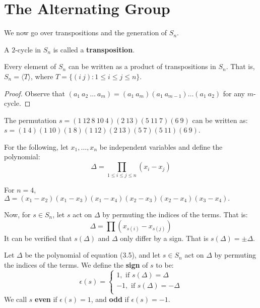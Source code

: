 \section{The Alternating Group}
\label{section_3.6}

We now go over transpositions and the generation of $S_n$.

\begin{definition}
  A $2$-cycle in  $S_n$ is called a \textbf{transposition}.
\end{definition}

\begin{proposition}\label{proposition_3.6.1}
  Every element of $S_n$ can be written as a product of transpositions in
  $S_n$. That is,  $S_n=\langle T \rangle $, where $T=\{(i \ j) : 1 \leq i \leq j \leq
  n\}$.
\end{proposition}
\begin{proof}
  Observe that $(a_1 \ a_2 \ \dots \ a_m)=(a_1 \ a_m)(a_1 \ a_{m-1}) \dots
  (a_1 \ a_2)$ for any $m$-cycle.
\end{proof}

\begin{example}\label{example_3.11}
  The permutation $s=(1 \ 12 \ 8  \ 10 \ 4)(2 \ 13)(5 \ 11 \ 7)(6 \ 9)$ can be
  written as: $s=(1 \ 4)(1 \ 10)(1 \ 8)(1 \ 12)(2 \ 13)(5 \ 7)(5 \ 11)(6 \
  9)$.
\end{example}

For the following, let $x_1, \dots, x_n$ be independent variables and define the
polynomial:
\begin{equation}
  \Delta=\prod_{1 \leq i \leq j \leq n}{(x_i-x_j)}
\end{equation}

\begin{example}\label{example_3.12}
  For $n=4$,  $\Delta=(x_1-x_2)(x_1-x_3)(x_1-x_4)(x_2-x_3)(x_2-x_4)(x_3-x_4).$
\end{example}

Now, for $s \in S_n$, let $s$ act on  $\Delta$ by permuting the indices of the
terms. That is:
\begin{equation*}
  \Delta=\prod{(x_{s(i)}-x_{s(j)})}
\end{equation*}
It can be verified that $s(\Delta)$ and $\Delta$ only differ by a sign. That is
$s(\Delta)=\pm\Delta$.

\begin{definition}
  Let $\Delta$ be the polynomial of equation (3.5), and let $s \in S_n$ act on
  $\Delta$ by permuting the indices of the terms. We define the
  \textbf{sign} of $s$ to be:
  \begin{equation}
    \epsilon(s)=\begin{cases}
      1, \text{ if } s(\Delta)=\Delta \\
      -1, \text{ if } s(\Delta)=-\Delta \\
    \end{cases}
  \end{equation}
  We call $s$  \textbf{even} if $\epsilon(s)=1$, and  \textbf{odd} if
  $\epsilon(s)=-1$.
\end{definition}

